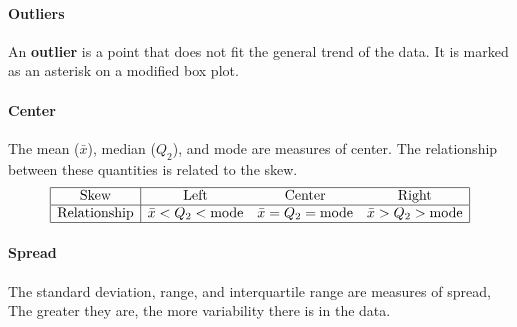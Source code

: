 \documentclass[../AP_Statistics.tex]{subfiles}
\begin{document}
				\paragraph{Outliers}
					An \textbf{outlier} is a point that does not fit the general trend of the data. It is marked as an asterisk on a modified box plot. \\
				\paragraph{Center}
					The mean ($\bar{x}$), median ($Q_2$), and mode are measures of center. The relationship between these quantities is related to the skew.
					\[\begin{array}{|c|ccc|}\hline
						\rm{Skew} & \rm{Left} & \rm{Center} & \rm{Right} \\\hline
						\rm{Relationship} & \bar{x} < Q_2 < \rm{mode} & \bar{x} = Q_2 = \rm{mode} & \bar{x} > Q_2 > \rm{mode} \\\hline
					\end{array}\]
				\paragraph{Spread}
					The standard deviation, range, and interquartile range are measures of spread, The greater they are, the more variability there is in the data.
\end{document}
